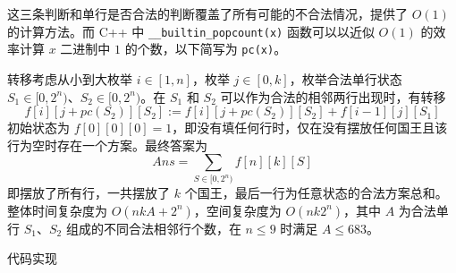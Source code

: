 这三条判断和单行是否合法的判断覆盖了所有可能的不合法情况，提供了
\(O(1)\) 的计算方法。而 C++ 中 \texttt{\_\_builtin\_popcount(x)}
函数可以以近似 \(O(1)\) 的效率计算 \(x\) 二进制中 \(1\)
的个数，以下简写为 \texttt{pc(x)}。

转移考虑从小到大枚举 \(i\in[1,n]\)，枚举 \(j\in[0,k]\)，枚举合法单行状态
\(S_1\in[0,2^n)\)、\(S_2\in[0,2^n)\)。在 \(S_1\) 和 \(S_2\)
可以作为合法的相邻两行出现时，有转移 \[
f[i][j+pc(S_2)][S_2]:=f[i][j+pc(S_2)][S_2]+f[i-1][j][S_1]
\] 初始状态为
\(f[0][0][0]=1\)，即没有填任何行时，仅在没有摆放任何国王且该行为空时存在一个方案。最终答案为
\[
Ans=\sum_{S\in[0,2^n)}f[n][k][S]
\] 即摆放了所有行，一共摆放了 \(k\)
个国王，最后一行为任意状态的合法方案总和。整体时间复杂度为
\(O(nkA+2^n)\)，空间复杂度为 \(O(nk2^n)\)，其中 \(A\) 为合法单行
\(S_1\)、\(S_2\) 组成的不同合法相邻行个数，在 \(n\le 9\) 时满足
\(A\le 683\)。

代码实现

